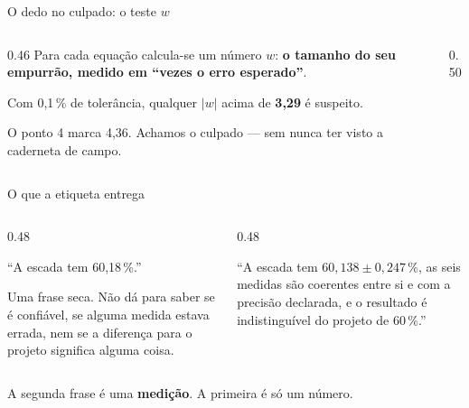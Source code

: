 \documentclass[aspectratio=169,11pt]{beamer}
\newcommand{\bnum}[1]{\textbf{\textcolor{mTeal}{#1}}}
\begin{document}
\begin{frame}{O dedo no culpado: o teste $w$}
  \begin{columns}[T]
    \begin{column}{0.46\textwidth}
      Para cada equação calcula-se um número $w$: \bnum{o tamanho do seu empurrão,
      medido em ``vezes o erro esperado''}.
      \medskip

      Com 0,1\,\% de tolerância, qualquer $|w|$ acima de \bnum{3,29} é suspeito.
      \medskip

      O ponto 4 marca \alert{4,36}. Achamos o culpado --- sem nunca ter visto a
      caderneta de campo.
    \end{column}
    \begin{column}{0.50\textwidth}
      \centering
    \end{column}
  \end{columns}
\end{frame}

\begin{frame}{O que a etiqueta entrega}
  \begin{columns}[T]
    \begin{column}{0.48\textwidth}
      \begin{ideia}[title={Sem ajustamento}]
        ``A escada tem 60,18\,\%.''
        \medskip

        Uma frase seca. Não dá para saber se é confiável, se alguma medida estava
        errada, nem se a diferença para o projeto significa alguma coisa.
      \end{ideia}
    \end{column}
    \begin{column}{0.48\textwidth}
      \begin{ideia}[title={Com ajustamento}]
        ``A escada tem $60{,}138 \pm 0{,}247\,\%$, as seis medidas são coerentes entre si
        e com a precisão declarada, e o resultado é indistinguível do projeto de
        60\,\%.''
      \end{ideia}
    \end{column}
  \end{columns}
  \bigskip
  \centering
  A segunda frase é uma \bnum{medição}. A primeira é só um número.
\end{frame}
\end{document}
